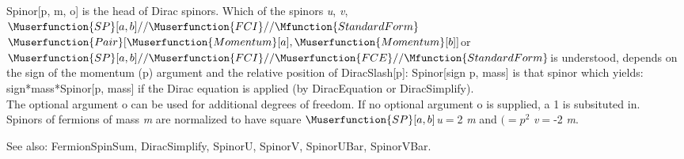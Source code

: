 












Spinor[p, m, o] is the head of Dirac spinors. Which of the spinors {\itshape u}, {\itshape v}, \(\Muserfunction{SP}[a,b]//\Muserfunction{FCI}//\Mfunction{StandardForm}\)
\(\Muserfunction{Pair}[\Muserfunction{Momentum}[a],\Muserfunction{Momentum}[b]]\)or \(\Muserfunction{SP}[a,b]//\Muserfunction{FCI}//\Muserfunction{FCE}//\Mfunction{StandardForm}\)is
understood, depends on the sign of the momentum (p) argument and the relative position of DiracSlash[p]: Spinor[sign p, mass] is that
  spinor which yields: sign*mass*Spinor[p, mass] if the Dirac equation is applied (by DiracEquation or DiracSimplify).\\
The optional argument o can be used for additional degrees of freedom. If no optional argument o is supplied, a 1 is subsituted in.\\
Spinors of fermions of mass {\itshape m} are normalized to have square \(\Muserfunction{SP}[a,b]\){\itshape u}\(=\)2 {\itshape m} and { }\((={p^2}\){\itshape
v\(=\)}-2 {\itshape m}.

See also:  FermionSpinSum, DiracSimplify, SpinorU, SpinorV, SpinorUBar, SpinorVBar.




